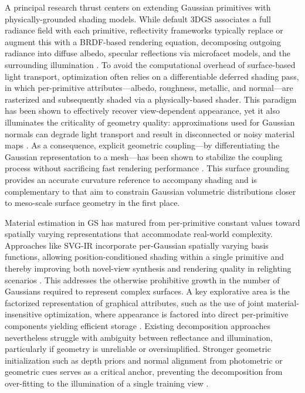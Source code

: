 \documentclass[11pt,a4paper]{article}
\begin{document}
A principal research thrust centers on extending Gaussian primitives with physically-grounded shading models. While default 3DGS associates a full radiance field with each primitive, reflectivity frameworks typically replace or augment this with a BRDF-based rendering equation, decomposing outgoing radiance into diffuse albedo, specular reflections via microfacet models, and the surrounding illumination \cite{arxiv:2504.06815v1,arxiv:2402.15870v1}. To avoid the computational overhead of surface-based light transport, optimization often relies on a differentiable deferred shading pass, in which per-primitive attributes---albedo, roughness, metallic, and normal---are rasterized and subsequently shaded via a physically-based shader. This paradigm has been shown to effectively recover view-dependent appearance, yet it also illuminates the criticality of geometry quality: approximations used for Gaussian normals can degrade light transport and result in disconnected or noisy material maps \cite{arxiv:2410.24204v3}. As a consequence, explicit geometric coupling---by differentiating the Gaussian representation to a mesh---has been shown to stabilize the coupling process without sacrificing fast rendering performance \cite{arxiv:2311.12775v3,arxiv:2410.08941v1}. This surface grounding provides an accurate curvature reference to accompany shading \cite{arxiv:2410.24204v3} and is complementary to \cite{arxiv:2403.17888v1,arxiv:2404.10772v1} that aim to constrain Gaussian volumetric distributions closer to meso-scale surface geometry in the first place.

Material estimation in GS has matured from per-primitive constant values toward spatially varying representations that accommodate real-world complexity. Approaches like SVG-IR incorporate per-Gaussian spatially varying basis functions, allowing position-conditioned shading within a single primitive and thereby improving both novel-view synthesis and rendering quality in relighting scenarios \cite{arxiv:2504.06815v1}. This addresses the otherwise prohibitive growth in the number of Gaussians required to represent complex surfaces. A key explorative area is the factorized representation of graphical attributes, such as the use of joint material-insensitive optimization, where appearance is factored into direct per-primitive components yielding efficient storage \cite{arxiv:2410.13613v3}. Existing decomposition approaches nevertheless struggle with ambiguity between reflectance and illumination, particularly if geometry is unreliable or oversimplified. Stronger geometric initialization such as depth priors and normal alignment from photometric or geometric cues serves as a critical anchor, preventing the decomposition from over-fitting to the illumination of a single training view \cite{arxiv:2403.17822v1}.
\end{document}
